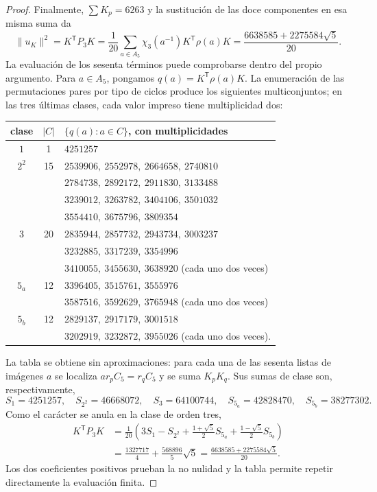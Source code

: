 \begin{proof}
Finalmente, \(\sum K_p=6263\) y la sustitución de las doce
componentes en esa misma suma da
\[
 \lVert u_K\rVert^2=K^{\mathsf T}P_3K
 =\frac1{20}\sum_{a\in A_5}
                \chi_3(a^{-1})K^{\mathsf T}\rho(a)K
 =\frac{6638585+2275584\sqrt5}{20}.
\]
La evaluación de los sesenta términos puede comprobarse dentro del
propio argumento. Para \(a\in A_5\), pongamos
\(q(a)=K^{\mathsf T}\rho(a)K\). La enumeración de las permutaciones
pares por tipo de ciclos produce los siguientes multiconjuntos; en las
tres últimas clases, cada valor impreso tiene multiplicidad dos:
\begin{center}
\footnotesize
\setlength{\tabcolsep}{5pt}
\begin{tabular}{@{}c|c|l@{}}
\textbf{clase}&\(\lvert C\rvert\)&
\(\{q(a):a\in C\}\), con multiplicidades\\ \hline
\(1\)&1&\(4251257\)\\
\(2^2\)&15&
\(2539906,\ 2552978,\ 2664658,\ 2740810\)\\
&&\(2784738,\ 2892172,\ 2911830,\ 3133488\)\\
&&\(3239012,\ 3263782,\ 3404106,\ 3501032\)\\
&&\(3554410,\ 3675796,\ 3809354\)\\
\(3\)&20&
\(2835944,\ 2857732,\ 2943734,\ 3003237\)\\
&&\(3232885,\ 3317239,\ 3354996\)\\
&&\(3410055,\ 3455630,\ 3638920\)\quad
   (cada uno dos veces)\\
\(5_a\)&12&
\(3396405,\ 3515761,\ 3555976\)\\
&&\(3587516,\ 3592629,\ 3765948\)\quad
   (cada uno dos veces)\\
\(5_b\)&12&
\(2829137,\ 2917179,\ 3001518\)\\
&&\(3202919,\ 3232872,\ 3955026\)\quad
   (cada uno dos veces).
\end{tabular}
\end{center}
La tabla se obtiene sin aproximaciones: para cada una de las sesenta
listas de imágenes \(a\) se localiza \(ar_pC_5=r_qC_5\) y se suma
\(K_pK_q\). Sus sumas de clase son, respectivamente,
\[
 S_1=4251257,\quad S_{2^2}=46668072,\quad S_3=64100744,\quad
 S_{5_a}=42828470,\quad S_{5_b}=38277302.
\]
Como el carácter se anula en la clase de orden tres,
\begin{align*}
 K^{\mathsf T}P_3K
 &=\frac1{20}\left(3S_1-S_{2^2}
       +\frac{1+\sqrt5}{2}S_{5_a}
       +\frac{1-\sqrt5}{2}S_{5_b}\right)\\
 &=\frac{1327717}{4}+\frac{568896}{5}\sqrt5
  =\frac{6638585+2275584\sqrt5}{20}.
\end{align*}
Los dos coeficientes positivos prueban la no nulidad y la tabla permite
repetir directamente la evaluación finita.
\end{proof}

